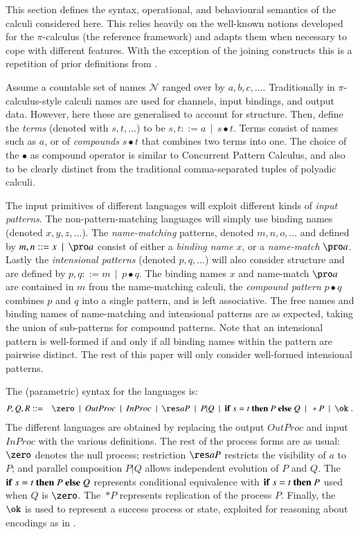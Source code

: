 \documentclass[submission,copyright,creativecommons]{eptcs}
\def\BNF{\ \  | \ \  }
\newcommand{\ifte}[4]{{\bf if}\ #1=#2\ {\bf then}\ #3\ {\bf else}\ #4}
\newcommand{\ift}[3]{{\bf if}\ #1=#2\ {\bf then}\ #3}
\begin{document}
This section defines the syntax, operational, and behavioural semantics of the calculi
considered here. This relies heavily on the well-known notions developed for the
$\pi$-calculus (the reference framework) and adapts them when necessary to cope with
different features. With the exception of the joining constructs this is a repetition
of prior definitions from \cite{givenwilson:hal-01026301}.

Assume a countable set of names ${\mathcal N}$ ranged over by $a,b,c,\ldots$. Traditionally in 
$\pi$-calculus-style calculi names are used for channels, input bindings, and output data. However, here these are generalised to account for structure. Then, define the {\em terms} (denoted with $s,t,\ldots$) to be
$s,t ::= a\BNF s\bullet t$.
Terms consist of names such as $a$, or of {\em compounds} $s\bullet t$ that combines two terms into one.
The choice of the $\bullet$ as compound operator is similar to Concurrent Pattern Calculus, and also to be clearly distinct from the traditional comma-separated tuples of polyadic calculi.

The input primitives of different languages will exploit different kinds of {\em input patterns}.
The non-pattern-matching languages will simply use binding names (denoted $x,y,z,\ldots$).
The {\em name-matching} patterns, denoted $m,n,o,\ldots$ and defined by
$m,n ::= x\BNF \pro a$
consist of either a {\em binding name} $x$, or a {\em name-match} $\pro a$.
Lastly the {\em intensional patterns} (denoted $p,q,\ldots$) will also consider structure and are defined by
$p,q ::= m\BNF p\bullet q$.
The binding names $x$ and name-match $\pro a$ are contained in $m$ from the name-matching calculi,
the {\em compound pattern} $p\bullet q$ combines $p$ and $q$ into a single pattern, and is left associative.
The free names and binding names of name-matching and intensional patterns are as expected, taking
the union of sub-patterns for compound patterns. Note that an intensional pattern is well-formed
if and only if all binding names within the pattern are pairwise distinct.
The rest of this paper will only consider well-formed intensional patterns.

The (parametric) syntax for the languages is:
\begin{eqnarray*}
P,Q,R &::=& \zero\BNF OutProc \BNF InProc \BNF \res a P \BNF P|Q\BNF \ifte s t P Q \BNF *P\BNF\ok\; .
\end{eqnarray*}
The different languages are obtained by replacing the output $OutProc$ and input $InProc$ with the various definitions.
The rest of the process forms are as usual:
$\zero$ denotes the null process;
restriction $\res a P$ restricts the visibility of $a$ to $P$;
and parallel composition $P|Q$ allows independent evolution of $P$ and $Q$.
The $\ifte s t P Q$ represents conditional equivalence with $\ift s t P$ used when $Q$ is $\zero$.
The~$*P$ represents replication of the process $P$.
Finally, the $\ok$ is used to represent a success process or state, exploited for reasoning about
encodings as in \cite{G:CONCUR08,GivenWilsonPHD}.
\end{document}

